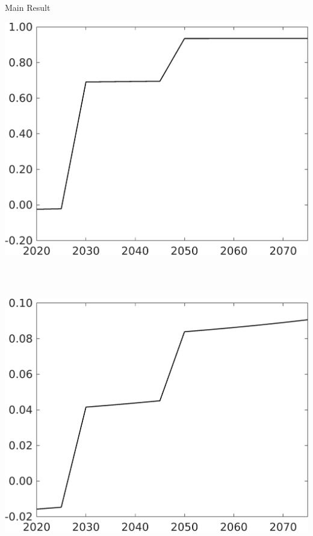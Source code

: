 \documentclass[11pt,aspectratio=169]{beamer}
\begin{document}
\begin{frame}{Main Result}
	\vspace{4mm}
			\centering
\begin{minipage}[]{0.32\textwidth}
	\includegraphics[width=1\textwidth]{../codding_model/own_basedOnFried/optimalPol_elastS_DisuSci/figures/all_1705/Single_OPT_T_NoTaus_tauf_spillover0_sep1_BN0_ineq0_red0_etaa0.79.png}
\end{minipage}
\begin{minipage}[]{0.05\textwidth}
	\ \ \\ 
	\ \ 
\end{minipage}
	\begin{minipage}[]{0.32\textwidth}
	\includegraphics[width=1\textwidth]{../codding_model/own_basedOnFried/optimalPol_elastS_DisuSci/figures/all_1705/Single_OPT_T_NoTaus_taul_spillover0_sep1_BN0_ineq0_red0_etaa0.79.png}

\end{minipage}
\end{frame}
\end{document}
